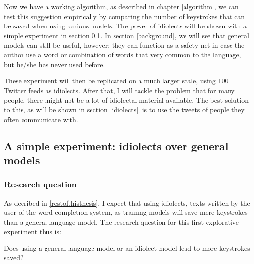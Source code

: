 \documentclass[12pt]{article}
\begin{document}
Now we have a working algorithm, as described in chapter \ref{algorithm}, we can test this suggestion empirically by comparing the number of keystrokes that can be saved when using various models. The power of idiolects will be shown with a simple experiment in section \ref{simple_exp}. In section \ref{background}, we will see that general models can still be useful, however; they can function as a safety-net in case the author use a word or combination of words that very common to the language, but he/she has never used before.

These experiment will then be replicated on a much larger scale, using 100 Twitter feeds as idiolects. After that, I will tackle the problem that for many people, there might not be a lot of idiolectal material available. The best solution to this, as will be shown in section \ref{idiolects}, is to use the tweets of people they often communicate with.

\subsection{A simple experiment: idiolects over general models} \label{simple_exp}

\subsubsection{Research question}
As decribed in \ref{restofthisthesis}, I expect that using idiolects, texts written by the user of the word completion system, as training models will save more keystrokes than a general language model. The research question for this first explorative experiment thus is:

\begin{examples}

\item Does using a general language model or an idiolect model lead to more keystrokes saved?

\end{examples}
\end{document}
